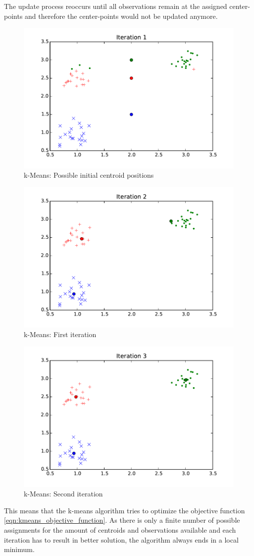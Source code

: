 The update process reoccurs until all observations remain at the assigned center-points and therefore the center-points would not be updated anymore.


\begin{figure}
\centering
\includegraphics[width=0.4\linewidth]{img/iteration01}
\caption{k-Means: Possible initial centroid positions}
\label{fig:kmeans:iteration01}
\end{figure}

\begin{figure}
\centering
\includegraphics[width=0.4\linewidth]{img/iteration02}
\caption{k-Means: First iteration}
\label{fig:kmeans:iteration02}
\end{figure}

\begin{figure}
\centering
\includegraphics[width=0.4\linewidth]{img/iteration03}
\caption{k-Means: Second iteration}
\label{fig:kmeans:iteration03}
\end{figure}


This means that the k-means algorithm tries to optimize the objective function \ref{eqn:kmeans_objective_function}. As there is only a finite number of possible assignments for the amount of centroids and observations available and each iteration has to result in better solution, the algorithm always ends in a local minimum.

